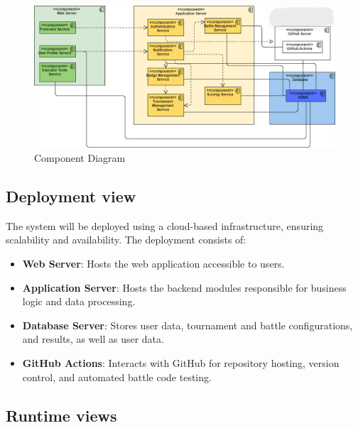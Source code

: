 \begin{figure}[H]
    \centering
    \includegraphics[width=\textwidth]{Graphics/Architecture/UML Component Diagram.png}
    \caption{Component Diagram}
    \label{fig:componentDiagram}
\end{figure}

\subsection{Deployment view}
The system will be deployed using a cloud-based infrastructure, ensuring scalability and availability. The deployment consists of:
\begin{itemize}
    \item \textbf {Web Server}: Hosts the web application accessible to users.
    \item \textbf {Application Server}: Hosts the backend modules responsible for business logic and data processing.
    \item \textbf {Database Server}: Stores user data, tournament and battle configurations, and results, as well as user data.
    \item \textbf {GitHub Actions}: Interacts with GitHub for repository hosting, version control, and automated battle code testing.
\end{itemize}
\subsection{Runtime views}
\newline
